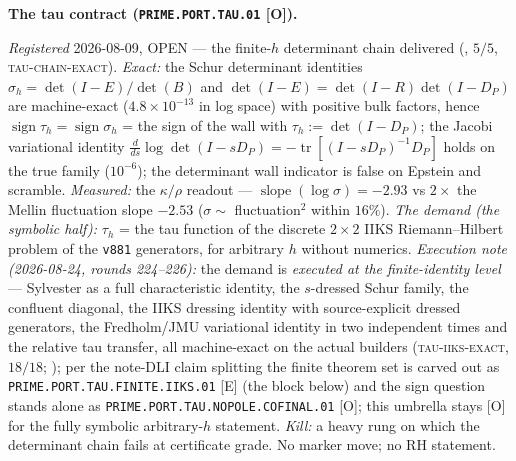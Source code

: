\documentclass[11pt,a4paper]{article}
\begin{document}
\par\smallskip\noindent\textbf{The tau contract
(\texttt{PRIME.PORT.\allowbreak TAU.01} [O]).}
{\sloppy
\emph{Registered} 2026-08-09, OPEN --- the finite-$h$
determinant chain delivered
(, $5/5$,
\textsc{tau-chain-exact}).  \emph{Exact:} the Schur determinant
identities $\sigma_h = \det(I - E)/\det(B)$ and $\det(I - E) =
\det(I - R)\det(I - D_P)$ are machine-exact
($4.8\times10^{-13}$ in log space) with positive bulk factors,
hence $\operatorname{sign}\tau_h = \operatorname{sign}\sigma_h$
= the sign of the wall with $\tau_h := \det(I - D_P)$; the
Jacobi variational identity $\frac{d}{ds}\log\det(I - sD_P) =
-\operatorname{tr}[(I - sD_P)^{-1}D_P]$ holds on the true family
($10^{-6}$); the determinant wall indicator is false on Epstein
and scramble.  \emph{Measured:} the $\kappa/\rho$ readout ---
$\operatorname{slope}(\log\sigma) = -2.93$ vs $2\times$ the
Mellin fluctuation slope $-2.53$ ($\sigma \sim$ fluctuation$^2$
within $16\%$).  \emph{The demand (the symbolic half):} $\tau_h$
= the tau function of the discrete $2\times2$ IIKS
Riemann--Hilbert problem of the \texttt{v881} generators, for
arbitrary $h$ without numerics.  \emph{Execution note
(2026-08-24, rounds 224--226):} the demand is \emph{executed at
the finite-identity level} --- Sylvester as a full
characteristic identity, the $s$-dressed Schur family, the
confluent diagonal, the IIKS dressing identity with
source-explicit dressed generators, the Fredholm/JMU variational
identity in two independent times and the relative tau transfer,
all machine-exact on the actual builders
(\textsc{tau-iiks-exact}, $18/18$;
); per the note-DLI
claim splitting the finite theorem set is carved out as
\texttt{PRIME.PORT.TAU.FINITE.IIKS.01} [E] (the block below) and
the sign question stands alone as
\texttt{PRIME.PORT.TAU.NOPOLE.COFINAL.01} [O]; this umbrella
stays [O] for the fully symbolic arbitrary-$h$ statement.
\emph{Kill:} a heavy rung on
which the determinant chain fails at certificate grade.  No
marker move; no RH statement.\par}
\end{document}
